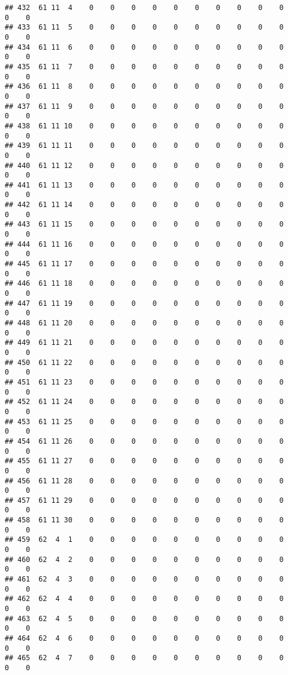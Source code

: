 \documentclass[]{article}
\begin{document}
\begin{verbatim}
## 432  61 11  4    0    0    0    0    0    0    0    0    0    0    0    0
## 433  61 11  5    0    0    0    0    0    0    0    0    0    0    0    0
## 434  61 11  6    0    0    0    0    0    0    0    0    0    0    0    0
## 435  61 11  7    0    0    0    0    0    0    0    0    0    0    0    0
## 436  61 11  8    0    0    0    0    0    0    0    0    0    0    0    0
## 437  61 11  9    0    0    0    0    0    0    0    0    0    0    0    0
## 438  61 11 10    0    0    0    0    0    0    0    0    0    0    0    0
## 439  61 11 11    0    0    0    0    0    0    0    0    0    0    0    0
## 440  61 11 12    0    0    0    0    0    0    0    0    0    0    0    0
## 441  61 11 13    0    0    0    0    0    0    0    0    0    0    0    0
## 442  61 11 14    0    0    0    0    0    0    0    0    0    0    0    0
## 443  61 11 15    0    0    0    0    0    0    0    0    0    0    0    0
## 444  61 11 16    0    0    0    0    0    0    0    0    0    0    0    0
## 445  61 11 17    0    0    0    0    0    0    0    0    0    0    0    0
## 446  61 11 18    0    0    0    0    0    0    0    0    0    0    0    0
## 447  61 11 19    0    0    0    0    0    0    0    0    0    0    0    0
## 448  61 11 20    0    0    0    0    0    0    0    0    0    0    0    0
## 449  61 11 21    0    0    0    0    0    0    0    0    0    0    0    0
## 450  61 11 22    0    0    0    0    0    0    0    0    0    0    0    0
## 451  61 11 23    0    0    0    0    0    0    0    0    0    0    0    0
## 452  61 11 24    0    0    0    0    0    0    0    0    0    0    0    0
## 453  61 11 25    0    0    0    0    0    0    0    0    0    0    0    0
## 454  61 11 26    0    0    0    0    0    0    0    0    0    0    0    0
## 455  61 11 27    0    0    0    0    0    0    0    0    0    0    0    0
## 456  61 11 28    0    0    0    0    0    0    0    0    0    0    0    0
## 457  61 11 29    0    0    0    0    0    0    0    0    0    0    0    0
## 458  61 11 30    0    0    0    0    0    0    0    0    0    0    0    0
## 459  62  4  1    0    0    0    0    0    0    0    0    0    0    0    0
## 460  62  4  2    0    0    0    0    0    0    0    0    0    0    0    0
## 461  62  4  3    0    0    0    0    0    0    0    0    0    0    0    0
## 462  62  4  4    0    0    0    0    0    0    0    0    0    0    0    0
## 463  62  4  5    0    0    0    0    0    0    0    0    0    0    0    0
## 464  62  4  6    0    0    0    0    0    0    0    0    0    0    0    0
## 465  62  4  7    0    0    0    0    0    0    0    0    0    0    0    0

\end{verbatim}
\end{document}
